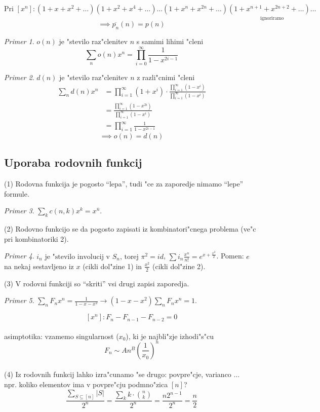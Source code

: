 \documentclass[a4paper,12pt]{article}
\theoremstyle{definition}
\theoremstyle{remark}
\newtheorem*{ex}{Primer}
\begin{document}
\[\text{Pri } [x^n]: (1 + x + x^2 + \ldots) (1 + x^2 + x^4 + \ldots) \ldots (1 + x^n + x^{2n} + \ldots)\underset{\text{ignoriramo}}{(1 + x^{n + 1} + x^{2n + 2} + \ldots) \ldots}\]
\[\implies \overline{p_n}(n) = p(n)\]

\begin{ex}
	$o(n)$ je "stevilo raz"clenitev $n$ s samimi lihimi "cleni
	\[\sum_n o(n) x^n = \prod_{i = 0}^{\infty} \frac{1}{1 - x^{2 i - 1}}\]
\end{ex}
\begin{ex}
	$d(n)$ je "stevilo raz"clenitev $n$ z razli"cnimi "cleni
	\begin{align*}
		\sum_n d(n) x^n &= \prod_{i = 1}^{\infty} (1 + x^i) \cdot \frac{\prod_{i = 1}^{\infty} (1 - x^i)}{\prod_{i = 1}^{\infty} (1 - x^i)}\\
		&= \frac{\prod_{i = 1}^{\infty} (1 - x^{2i})}{\prod_{i = 1}^{\infty} (1 - x^i)}\\
		&= \prod_{i = 1}^{\infty} \frac{1}{1 - x^{2i - 1}}
	\end{align*}
	\[\implies o(n) = d(n)\]
\end{ex}


\label{TODO: to sm malo spustu}
\subsection{Uporaba rodovnih funkcij}

(1) Rodovna funkcija je pogosto ``lepa'', tudi "ce za zaporedje nimamo ``lepe'' formule.
\begin{ex}
	$\sum_k c(n,k)x^k = x^{\overline{n}}$.
\end{ex}
(2) Rodovno funkcijo se da pogosto zapisati iz kombinatori"cnega problema (ve"c pri kombinatoriki 2).
\begin{ex}
	$i_n \text{ je "stevilo involucij v } S_n \text{, torej } \pi^2 = id$, $\sum i_n \frac{x^n}{n!} = e^{x+\frac{x^2}{2}}$.
	Pomen: $e$ na nekaj sestavljeno iz $x$ (cikli dol"zine 1) in $\frac{x^2}{2}$ (cikli dol"zine 2).
\end{ex}

(3) V rodovni funkciji so ``skriti'' vsi drugi zapisi zaporedja.
\begin{ex}
	$\sum_n F_n x^n = \frac{1}{1-x-x^2} \to (1-x-x^2) \sum_n F_n x^n = 1$.
\end{ex}
\[[x^n]: F_n - F_{n-1} - F_{n-2} = 0 \] \\
asimptotika: vzamemo singularnost ($x_0$), ki je najbli"zje izhodi"s"cu \[F_n \sim An^B(\frac{1}{x_0})^n\] \\
(4) Iz rodovnih funkcij lahko izra"cunamo "se drugo: povpre"cje, varianco $\dots$ \\
npr. koliko elementov ima v povpre"cju podmno"zica $[n]$?
\[\frac{\sum_{S \subseteq [n]} |S|}{2^n} = \frac{\sum_k k \cdot \binom{n}{k}}{2^n} = \frac{n2^{n-1}}{2^n} = \frac{n}{2}\]
\end{document}
